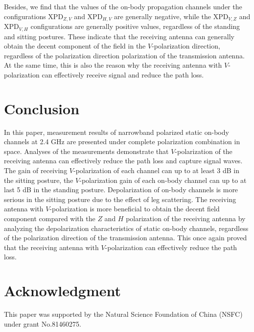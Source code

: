 \documentclass[conference]{IEEEtran}
\begin{document}

Besides, we find that the values of the on-body propagation channels under the configurations $\text{XPD}_{Z,V}$ and $\text{XPD}_{H,V}$ are generally negative, while the $\text{XPD}_{V,Z}$ and $\text{XPD}_{V,H}$ configurations are generally positive values, regardless of the standing and sitting postures. These indicate that the receiving antenna can generally obtain the decent component of the field in the $V$-polarization direction, regardless of the polarization direction polarization of the transmission antenna. At the same time, this is also the reason why the receiving antenna with $V$-polarization can effectively receive signal and reduce the path loss.

\section{Conclusion}\label{sec:conclusion}
In this paper, measurement results of narrowband polarized static on-body channels at 2.4 GHz are presented under complete polarization combination in space. Analyses of the measurements demonstrate that $V$-polarization of the receiving antenna can effectively reduce the path loss and capture signal waves. The gain of receiving $V$-polarization of each channel can up to at least 3 dB in the sitting posture, the $V$-polarization gain of each on-body channel can up to at last 5 dB in the standing posture. Depolarization of on-body channels is more serious in the sitting posture due to the effect of leg scattering. The receiving antenna with $V$-polarization is more beneficial to obtain the decent field component compared with the $Z$ and $H$ polarization of the receiving antenna by analyzing the depolarization characteristics of static on-body channels, regardless of the polarization direction of the transmission antenna. This once again proved that the receiving antenna with $V$-polarization can effectively reduce the path loss.

\section*{Acknowledgment}
This paper was supported by the Natural Science Foundation of China (NSFC) under grant No.81460275.
\end{document}

